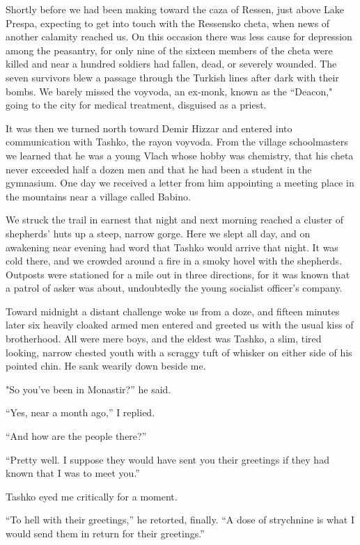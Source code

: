 \documentclass[a5paper,12pt]{book}
\begin{document}
Shortly before we had been making toward the caza of Ressen, just above Lake Prespa, expecting to get into touch with the Ressensko cheta, when news of another calamity reached us. On this occasion there was less cause for depression among the peasantry, for only nine of the sixteen members of the cheta were killed and near a hundred soldiers had fallen, dead, or severely wounded. The seven survivors blew a passage through the Turkish lines after dark with their bombs. We barely missed the voyvoda, an ex-monk, known as the “Deacon," going to the city for medical treatment, disguised as a priest.

It was then we turned north toward Demir Hizzar and entered into communication with Tashko, the rayon voyvoda. From the village schoolmasters we learned that he was a young Vlach whose hobby was chemistry, that his cheta never exceeded half a dozen men and that he had been a student in the gymnasium. One day we received a letter from him appointing a meeting place in the mountains near a village called Babino.

We struck the trail in earnest that night and next morning reached a cluster of shepherds’ huts up a steep, narrow gorge. Here we slept all day, and on awakening near evening had word that Tashko would arrive that night. It was cold there, and we crowded around a fire in a smoky hovel with the shepherds. Outposts were stationed for a mile out in three directions, for it was known that a patrol of asker was about, undoubtedly the young socialist officer’s company.

Toward midnight a distant challenge woke us from a doze, and fifteen minutes later six heavily cloaked armed men entered and greeted us with the usual kiss of brotherhood. All were mere boys, and the eldest was Tashko, a slim, tired looking, narrow chested youth with a scraggy tuft of whisker on either side of his pointed chin. He sank wearily down beside me.

"So you’ve been in Monastir?” he said.

“Yes, near a month ago,” I replied.

“And how are the people there?”

“Pretty well. I suppose they would have sent you their greetings if they had known that I was to meet you.”

Tashko eyed me critically for a moment.

“To hell with their greetings,” he retorted, finally. “A dose of strychnine is what I would send them in return for their greetings.”
\end{document}
